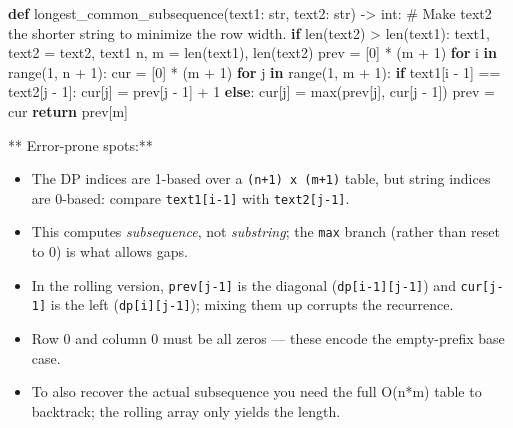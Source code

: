 \documentclass[11pt]{article}
\providecommand{\tightlist}{\setlength{\itemsep}{1pt}\setlength{\parskip}{0pt}}
\newenvironment{Shaded}{\begin{snugshade}}{\end{snugshade}}
\newcommand{\BuiltInTok}[1]{\textcolor[rgb]{0.50,0.55,0.55}{#1}}
\newcommand{\CommentTok}[1]{\textcolor[rgb]{0.48,0.49,0.49}{#1}}
\newcommand{\ControlFlowTok}[1]{\textcolor[rgb]{0.99,0.74,0.29}{\textbf{#1}}}
\newcommand{\DecValTok}[1]{\textcolor[rgb]{0.96,0.45,0.00}{#1}}
\newcommand{\KeywordTok}[1]{\textcolor[rgb]{0.81,0.81,0.76}{\textbf{#1}}}
\newcommand{\NormalTok}[1]{\textcolor[rgb]{0.81,0.81,0.76}{#1}}
\newcommand{\OperatorTok}[1]{\textcolor[rgb]{0.81,0.81,0.76}{#1}}
\begin{document}

\begin{Shaded}
\begin{Highlighting}[]
\KeywordTok{def}\NormalTok{ longest\_common\_subsequence(text1: }\BuiltInTok{str}\NormalTok{, text2: }\BuiltInTok{str}\NormalTok{) }\OperatorTok{{-}\textgreater{}} \BuiltInTok{int}\NormalTok{:}
    \CommentTok{\# Make text2 the shorter string to minimize the row width.}
    \ControlFlowTok{if} \BuiltInTok{len}\NormalTok{(text2) }\OperatorTok{\textgreater{}} \BuiltInTok{len}\NormalTok{(text1):}
\NormalTok{        text1, text2 }\OperatorTok{=}\NormalTok{ text2, text1}
\NormalTok{    n, m }\OperatorTok{=} \BuiltInTok{len}\NormalTok{(text1), }\BuiltInTok{len}\NormalTok{(text2)}
\NormalTok{    prev }\OperatorTok{=}\NormalTok{ [}\DecValTok{0}\NormalTok{] }\OperatorTok{*}\NormalTok{ (m }\OperatorTok{+} \DecValTok{1}\NormalTok{)}
    \ControlFlowTok{for}\NormalTok{ i }\KeywordTok{in} \BuiltInTok{range}\NormalTok{(}\DecValTok{1}\NormalTok{, n }\OperatorTok{+} \DecValTok{1}\NormalTok{):}
\NormalTok{        cur }\OperatorTok{=}\NormalTok{ [}\DecValTok{0}\NormalTok{] }\OperatorTok{*}\NormalTok{ (m }\OperatorTok{+} \DecValTok{1}\NormalTok{)}
        \ControlFlowTok{for}\NormalTok{ j }\KeywordTok{in} \BuiltInTok{range}\NormalTok{(}\DecValTok{1}\NormalTok{, m }\OperatorTok{+} \DecValTok{1}\NormalTok{):}
            \ControlFlowTok{if}\NormalTok{ text1[i }\OperatorTok{{-}} \DecValTok{1}\NormalTok{] }\OperatorTok{==}\NormalTok{ text2[j }\OperatorTok{{-}} \DecValTok{1}\NormalTok{]:}
\NormalTok{                cur[j] }\OperatorTok{=}\NormalTok{ prev[j }\OperatorTok{{-}} \DecValTok{1}\NormalTok{] }\OperatorTok{+} \DecValTok{1}
            \ControlFlowTok{else}\NormalTok{:}
\NormalTok{                cur[j] }\OperatorTok{=} \BuiltInTok{max}\NormalTok{(prev[j], cur[j }\OperatorTok{{-}} \DecValTok{1}\NormalTok{])}
\NormalTok{        prev }\OperatorTok{=}\NormalTok{ cur}
    \ControlFlowTok{return}\NormalTok{ prev[m]}
\end{Highlighting}
\end{Shaded}

** Error-prone spots:**

\begin{itemize}
\tightlist
\item
  The DP indices are 1-based over a \texttt{(n+1)\ x\ (m+1)} table, but string indices are 0-based: compare \texttt{text1{[}i-1{]}} with \texttt{text2{[}j-1{]}}.
\item
  This computes \emph{subsequence}, not \emph{substring}; the \texttt{max} branch (rather than reset to 0) is what allows gaps.
\item
  In the rolling version, \texttt{prev{[}j-1{]}} is the diagonal (\texttt{dp{[}i-1{]}{[}j-1{]}}) and \texttt{cur{[}j-1{]}} is the left (\texttt{dp{[}i{]}{[}j-1{]}}); mixing them up corrupts the recurrence.
\item
  Row 0 and column 0 must be all zeros --- these encode the empty-prefix base case.
\item
  To also recover the actual subsequence you need the full O(n*m) table to backtrack; the rolling array only yields the length.
\end{itemize}
\end{document}
